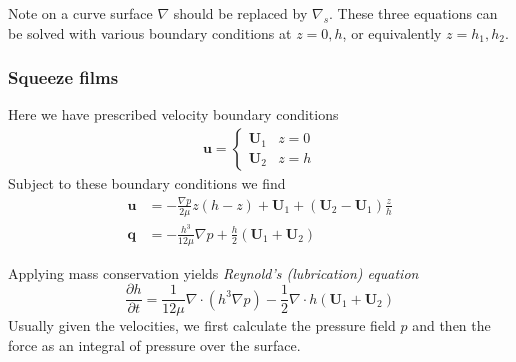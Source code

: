 \documentclass{jknotes}
\begin{document}
Note on a curve surface $\nabla$ should be replaced by $\nabla_s$. These three
equations can be solved with various boundary conditions at $z=0,h$, or
equivalently $z=h_1, h_2$.

\subsubsection{Squeeze films}
Here we have prescribed velocity boundary conditions
\begin{align}
	\symbf{u} = \begin{cases} \symbf{U}_1 & z=0 \\ \symbf{U}_2 & z=h
	\end{cases}
\end{align}
Subject to these boundary conditions we find
\begin{align}
	\symbf{u} &= -\frac{\nabla p}{2\mu} z(h-z) + \symbf{U}_1 +
	(\symbf{U}_2-\symbf{U}_1) \frac{z}{h}\\
	\symbf{q} &= -\frac{h^3}{12\mu}\nabla p +
	\frac{h}{2}(\symbf{U}_1+\symbf{U}_2)
\end{align}

Applying mass conservation yields \emph{Reynold's (lubrication) equation}
\begin{equation}
	\frac{\partial h}{\partial t} = \frac{1}{12\mu} \nabla \cdot (h^3 \nabla
	p) - \frac{1}{2} \nabla \cdot h(\symbf{U}_1+\symbf{U}_2)
\end{equation}
Usually given the velocities, we first calculate the pressure field $p$ and
then the force as an integral of pressure over the surface.
\end{document}
